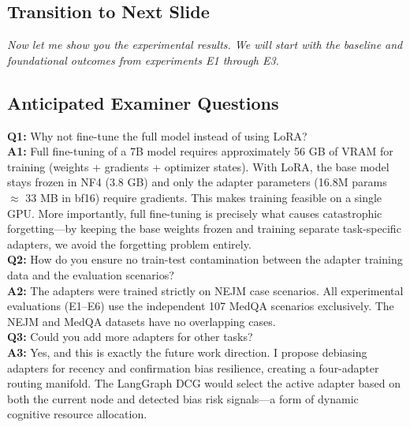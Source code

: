 \documentclass[12pt]{article}
\begin{document}
  \subsection*{Transition to Next Slide}
  {\color{transgreen}
  \textit{Now let me show you the experimental results. We will start with the baseline and foundational outcomes from experiments E1 through E3.}
  }

  \subsection*{Anticipated Examiner Questions}
  \begin{qabox}
  \textbf{Q1:} Why not fine-tune the full model instead of using LoRA? \\
  \textbf{A1:} Full fine-tuning of a 7B model requires approximately 56 GB of VRAM for training (weights + gradients + optimizer states). With LoRA, the base model stays frozen in NF4 (3.8 GB) and only the adapter parameters (16.8M params $\approx$ 33 MB in bf16) require gradients. This makes training feasible on a single GPU. More importantly, full fine-tuning is precisely what causes catastrophic forgetting---by keeping the base weights frozen and training separate task-specific adapters, we avoid the forgetting problem entirely. \\[6pt]
  \textbf{Q2:} How do you ensure no train-test contamination between the adapter training data and the evaluation scenarios? \\
  \textbf{A2:} The adapters were trained strictly on NEJM case scenarios. All experimental evaluations (E1--E6) use the independent 107 MedQA scenarios exclusively. The NEJM and MedQA datasets have no overlapping cases. \\[6pt]
  \textbf{Q3:} Could you add more adapters for other tasks? \\
  \textbf{A3:} Yes, and this is exactly the future work direction. I propose debiasing adapters for recency and confirmation bias resilience, creating a four-adapter routing manifold. The LangGraph DCG would select the active adapter based on both the current node and detected bias risk signals---a form of dynamic cognitive resource allocation.
  \end{qabox}



\end{document}
